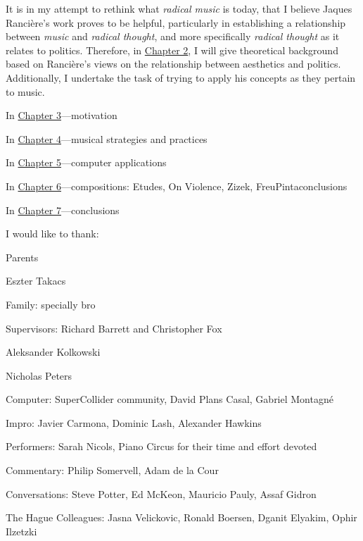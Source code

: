 It is in my attempt to rethink what \emph{radical music} is today, that I believe Jaques Ranci\`{e}re's work proves to be helpful, particularly in establishing a relationship between \emph{music} and \emph{radical thought}, and more specifically \emph{radical thought} as it relates to politics. Therefore, in \hyperlink{chapter2}{Chapter 2}, I will give theoretical background based on Ranci\`{e}re's views on the relationship between aesthetics and politics. Additionally, I undertake the task of trying to apply his concepts as they pertain to music. 

In \hyperlink{chapter3}{Chapter 3}---motivation

In \hyperlink{chapter4}{Chapter 4}---musical strategies and practices

In \hyperlink{chapter5}{Chapter 5}---computer applications

In \hyperlink{chapter6}{Chapter 6}---compositions: Etudes, On Violence, Zizek, FreuPintaconclusions

In \hyperlink{chapter7}{Chapter 7}---conclusions

I would like to thank:

Parents 

Eszter Takacs

Family: specially bro

Supervisors: Richard Barrett and Christopher Fox

Aleksander Kolkowski

Nicholas Peters

Computer: SuperCollider community, David Plans Casal, Gabriel Montagn\'e

Impro: Javier Carmona, Dominic Lash, Alexander Hawkins

Performers: Sarah Nicols, Piano Circus for their time and effort devoted

Commentary: Philip Somervell, Adam de la Cour

Conversations: Steve Potter, Ed McKeon, Mauricio Pauly, Assaf Gidron

The Hague Colleagues: Jasna Velickovic, Ronald Boersen, Dganit Elyakim, Ophir Ilzetzki

\label{ch:preface}
